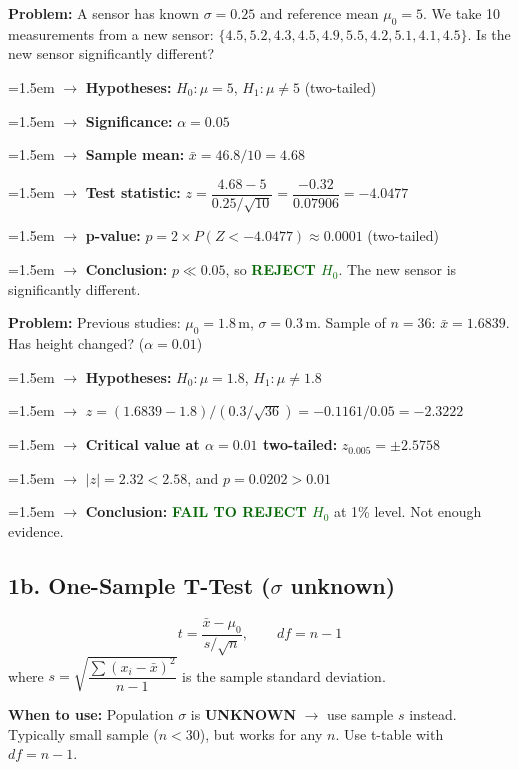 \documentclass[11pt, letterpaper]{article}
\newcommand{\ans}[1]{\textbf{\textcolor{darkgreen}{#1}}}
\newcommand{\step}[1]{\par\hangindent=1.5em\hangafter=1 $\rightarrow$ #1}
\begin{document}
\begin{examplebox}
\textbf{Problem:} A sensor has known $\sigma = 0.25$ and reference mean $\mu_0 = 5$. We take 10 measurements from a new sensor: $\{4.5, 5.2, 4.3, 4.5, 4.9, 5.5, 4.2, 5.1, 4.1, 4.5\}$. Is the new sensor significantly different?

\step{\textbf{Hypotheses:} $H_0: \mu = 5$, \quad $H_1: \mu \neq 5$ (two-tailed)}
\step{\textbf{Significance:} $\alpha = 0.05$}
\step{\textbf{Sample mean:} $\bar{x} = 46.8/10 = 4.68$}
\step{\textbf{Test statistic:} $z = \dfrac{4.68 - 5}{0.25/\sqrt{10}} = \dfrac{-0.32}{0.07906} = \mathbf{-4.0477}$}
\step{\textbf{p-value:} $p = 2 \times P(Z < -4.0477) \approx \mathbf{0.0001}$ (two-tailed)}
\step{\textbf{Conclusion:} $p \ll 0.05$, so \ans{REJECT $H_0$}. The new sensor is significantly different.}
\end{examplebox}

\begin{examplebox}
\textbf{Problem:} Previous studies: $\mu_0 = 1.8$\,m, $\sigma = 0.3$\,m. Sample of $n=36$: $\bar{x} = 1.6839$. Has height changed? ($\alpha = 0.01$)

\step{\textbf{Hypotheses:} $H_0: \mu = 1.8$, \quad $H_1: \mu \neq 1.8$}
\step{$z = (1.6839 - 1.8) / (0.3/\sqrt{36}) = -0.1161 / 0.05 = \mathbf{-2.3222}$}
\step{\textbf{Critical value at $\alpha=0.01$ two-tailed:} $z_{0.005} = \pm 2.5758$}
\step{$|z| = 2.32 < 2.58$, and $p = 0.0202 > 0.01$}
\step{\textbf{Conclusion:} \ans{FAIL TO REJECT $H_0$} at 1\% level. Not enough evidence.}
\end{examplebox}

\subsection{1b. One-Sample T-Test ($\sigma$ unknown)}

\begin{formulabox}
\[ t = \frac{\bar{x} - \mu_0}{s / \sqrt{n}}, \qquad df = n - 1 \]
where $s = \sqrt{\dfrac{\sum(x_i - \bar{x})^2}{n-1}}$ is the sample standard deviation.

\medskip
\textbf{When to use:} Population $\sigma$ is \textbf{UNKNOWN} $\rightarrow$ use sample $s$ instead. Typically small sample ($n < 30$), but works for any $n$. Use t-table with $df = n-1$.
\end{formulabox}
\end{document}
